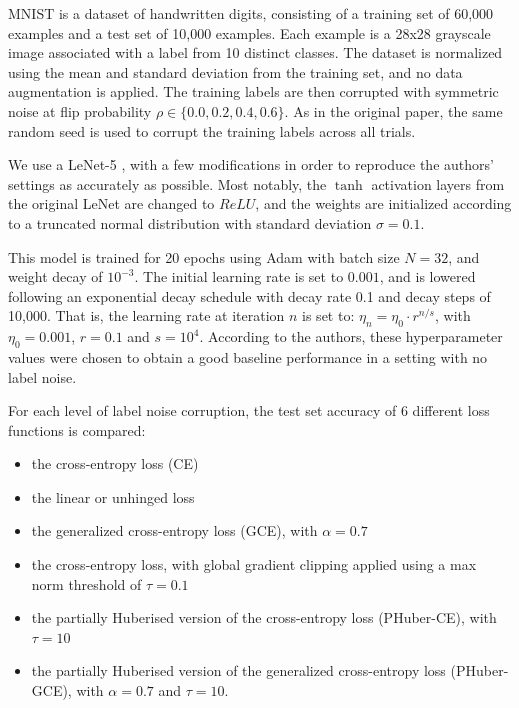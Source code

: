 MNIST is a dataset of handwritten digits, consisting of a training set of 60,000 examples and a test set of 10,000 examples. Each example is a 28x28 grayscale image associated with a label from 10 distinct classes. The dataset is normalized using the mean and standard deviation from the training set, and no data augmentation is applied. The training labels are then corrupted with symmetric noise at flip probability $\rho \in \{0.0,0.2,0.4,0.6\}$. As in the original paper, the same random seed is used to corrupt the training labels across all trials.

We use a LeNet-5 \parencite{lecun_gradient-based_1998}, with a few modifications in order to reproduce the authors' settings as accurately as possible. Most notably, the $\tanh$ activation layers from the original LeNet are changed to $ReLU$, and the weights are initialized according to a truncated normal distribution with standard deviation $\sigma = 0.1$. 

This model is trained for 20 epochs using Adam \parencite{kingma_adam_2017} with batch size $N=32$, and weight decay of $10^{-3}$. The initial learning rate is set to $0.001$, and is lowered  following an exponential decay schedule with decay rate 0.1 and decay steps of 10,000. That is, the learning rate at iteration $n$ is set to: $\eta_{n} = \eta_{0} \cdot r^{n/s}$, with $\eta_{0} = 0.001$, $r = 0.1$ and $s=10^4$. According to the authors, these hyperparameter values were chosen to obtain a good baseline performance in a setting with no label noise.

For each level of label noise corruption, the test set accuracy of 6 different loss functions is compared: 
\begin{itemize}[noitemsep]
    \item the cross-entropy loss (CE)
    \item the linear or unhinged loss \parencite{van_rooyen_learning_2015}
    \item the generalized cross-entropy loss (GCE), with $\alpha=0.7$ \parencite{zhang_generalized_2018}
    \item the cross-entropy loss, with global gradient clipping applied using a max norm threshold of $\tau=0.1$ 
    \item the partially Huberised version of the cross-entropy loss (PHuber-CE), with $\tau=10$
    \item the partially Huberised version of the generalized cross-entropy loss (PHuber-GCE), with $\alpha=0.7$ and $\tau=10$.
\end{itemize}

